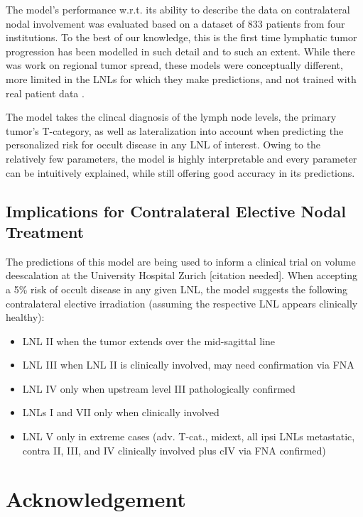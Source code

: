 \documentclass[
  sn-mathphys-num,
]{sn-jnl}
\providecommand{\tightlist}{%
  \setlength{\itemsep}{0pt}\setlength{\parskip}{0pt}}\usepackage{longtable,booktabs,array}
\begin{document}
The model's performance w.r.t. its ability to describe the data on
contralateral nodal involvement was evaluated based on a dataset of 833
patients from four institutions. To the best of our knowledge, this is
the first time lymphatic tumor progression has been modelled in such
detail and to such an extent. While there was work on regional tumor
spread, these models were conceptually different, more limited in the
LNLs for which they make predictions, and not trained with real patient
data \citep{benson_markov_2006, jung_development_2017}.

The model takes the clincal diagnosis of the lymph node levels, the
primary tumor's T-category, as well as lateralization into account when
predicting the personalized risk for occult disease in any LNL of
interest. Owing to the relatively few parameters, the model is highly
interpretable and every parameter can be intuitively explained, while
still offering good accuracy in its predictions.

\subsection{Implications for Contralateral Elective Nodal
Treatment}\label{implications-for-contralateral-elective-nodal-treatment}

The predictions of this model are being used to inform a clinical trial
on volume deescalation at the University Hospital Zurich {[}citation
needed{]}. When accepting a 5\% risk of occult disease in any given LNL,
the model suggests the following contralateral elective irradiation
(assuming the respective LNL appears clinically healthy):

\begin{itemize}
\tightlist
\item
  LNL II when the tumor extends over the mid-sagittal line
\item
  LNL III when LNL II is clinically involved, may need confirmation via
  FNA
\item
  LNL IV only when upstream level III pathologically confirmed
\item
  LNLs I and VII only when clinically involved
\item
  LNL V only in extreme cases (adv. T-cat., midext, all ipsi LNLs
  metastatic, contra II, III, and IV clinically involved plus cIV via
  FNA confirmed)
\end{itemize}

\section{Acknowledgement}\label{acknowledgement}
\end{document}
